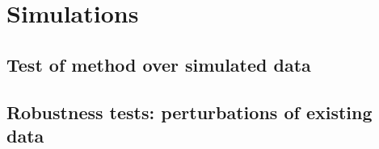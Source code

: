 \documentclass[../../ArchStats.tex]{subfiles}
\begin{document}
\section{Simulations}

\subsection{Test of method over simulated data}

\subsection{Robustness tests: perturbations of existing data}
\end{document}
